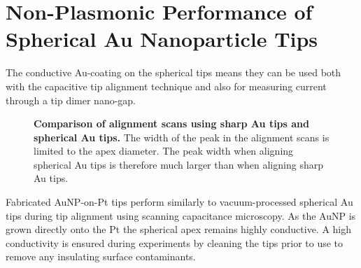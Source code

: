 \documentclass{article}
\begin{document}
\section{Non-Plasmonic Performance of Spherical Au Nanoparticle Tips}

The conductive Au-coating on the spherical tips means they can be used both with the capacitive tip alignment technique and also for measuring current through a tip dimer nano-gap.

\begin{figure}[h]
\caption[Comparison of alignment scans using sharp Au tips and spherical Au tips]{\textbf{Comparison of alignment scans using sharp Au tips and spherical Au tips.} The width of the peak in the alignment scans is limited to the apex diameter. The peak width when aligning spherical Au tips is therefore much larger than when aligning sharp Au tips.}
\label{fig:tip_alignment_comparison}
\end{figure}

Fabricated AuNP-on-Pt tips perform similarly to vacuum-processed spherical Au tips during tip alignment using scanning capacitance microscopy. As the AuNP is grown directly onto the Pt the spherical apex remains highly conductive. A high conductivity is ensured during experiments by cleaning the tips prior to use to remove any insulating surface contaminants.
\end{document}

